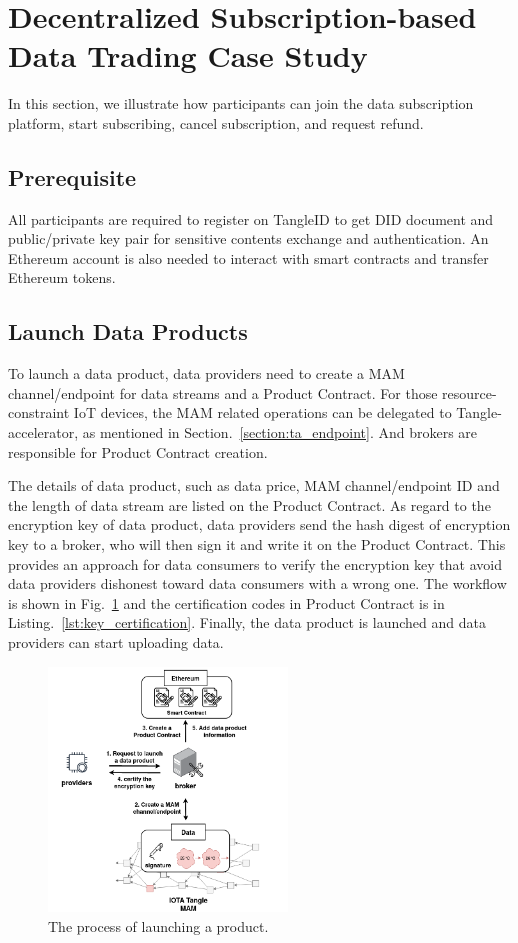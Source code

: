\documentclass[conference]{IEEEtran}
\begin{document}
\section{Decentralized Subscription-based Data Trading Case Study}
\label{section:trading_model}
In this section, we illustrate how participants can join the data subscription platform, start subscribing, cancel subscription, and request refund.

\subsection{Prerequisite}
All participants are required to register on TangleID to get DID document and public/private key pair for sensitive contents exchange and authentication. An Ethereum account is also needed to interact with smart contracts and transfer Ethereum tokens.

\subsection{Launch Data Products}
To launch a data product, data providers need to create a MAM channel/endpoint for data streams and a Product Contract. For those resource-constraint IoT devices, the MAM related operations can be delegated to Tangle-accelerator, as mentioned in Section.~\ref{section:ta_endpoint}. And brokers are responsible for Product Contract creation. 

The details of data product, such as data price, MAM channel/endpoint ID and the length of data stream are listed on the Product Contract. As regard to the encryption key of data product, data providers send the hash digest of encryption key to a broker, who will then sign it and write it on the Product Contract. This provides an approach for data consumers to verify the encryption key that avoid data providers dishonest toward data consumers with a wrong one. The workflow is shown in Fig.~\ref{fig:launching_product} and the certification codes in Product Contract is in Listing.~\ref{lst:key_certification}. Finally, the data product is launched and data providers can start uploading data.
 
\begin{figure}[!t]
    \centering
    \includegraphics[width=2.5in]{launching_product}
    \caption{The process of launching a product.}
    \label{fig:launching_product}
\end{figure}
\end{document}
